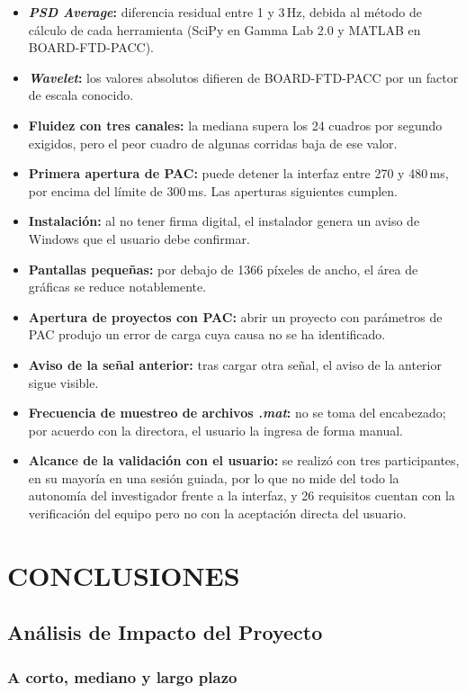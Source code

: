 \documentclass[12pt,letterpaper,oneside]{article}
\newcommand{\capitulo}[1]{\clearpage\section{#1}}
\begin{document}
\begin{itemize}
  \item \textbf{\textit{PSD Average}:} diferencia residual entre 1 y 3\,Hz, debida al método de cálculo de cada herramienta (SciPy en Gamma Lab 2.0 y MATLAB en BOARD-FTD-PACC).
  \item \textbf{\textit{Wavelet}:} los valores absolutos difieren de BOARD-FTD-PACC por un factor de escala conocido.
  \item \textbf{Fluidez con tres canales:} la mediana supera los 24 cuadros por segundo exigidos, pero el peor cuadro de algunas corridas baja de ese valor.
  \item \textbf{Primera apertura de PAC:} puede detener la interfaz entre 270 y 480\,ms, por encima del límite de 300\,ms. Las aperturas siguientes cumplen.
  \item \textbf{Instalación:} al no tener firma digital, el instalador genera un aviso de Windows que el usuario debe confirmar.
  \item \textbf{Pantallas pequeñas:} por debajo de 1366 píxeles de ancho, el área de gráficas se reduce notablemente.
  \item \textbf{Apertura de proyectos con PAC:} abrir un proyecto con parámetros de PAC produjo un error de carga cuya causa no se ha identificado.
  \item \textbf{Aviso de la señal anterior:} tras cargar otra señal, el aviso de la anterior sigue visible.
  \item \textbf{Frecuencia de muestreo de archivos \textit{.mat}:} no se toma del encabezado; por acuerdo con la directora, el usuario la ingresa de forma manual.
  \item \textbf{Alcance de la validación con el usuario:} se realizó con tres participantes, en su mayoría en una sesión guiada, por lo que no mide del todo la autonomía del investigador frente a la interfaz, y 26 requisitos cuentan con la verificación del equipo pero no con la aceptación directa del usuario.
\end{itemize}

\capitulo{CONCLUSIONES}

\subsection{Análisis de Impacto del Proyecto}

\subsubsection{A corto, mediano y largo plazo}
\end{document}

